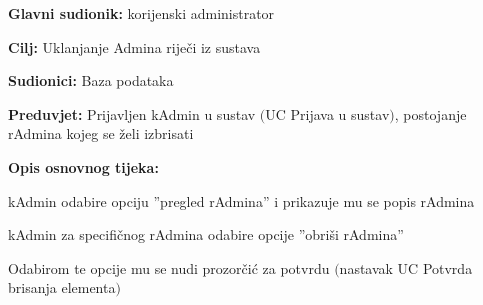 					\noindent {}
					\begin{packed_item}
	
						\item \textbf{Glavni sudionik: }korijenski administrator
						\item  \textbf{Cilj:} Uklanjanje Admina riječi iz sustava
						\item  \textbf{Sudionici:} Baza podataka
						\item  \textbf{Preduvjet:} Prijavljen kAdmin u sustav $($UC Prijava u sustav$)$, postojanje
						rAdmina kojeg se želi izbrisati
						\item  \textbf{Opis osnovnog tijeka:}
						
						\item[] \begin{packed_enum}
	
							\item kAdmin odabire opciju ”pregled rAdmina” i prikazuje mu se popis rAdmina
							\item kAdmin za specifičnog rAdmina odabire opcije ”obriši rAdmina”
							\item Odabirom te opcije mu se nudi prozorčić za potvrdu $($nastavak UC Potvrda brisanja elementa$)$
						\end{packed_enum}
						
					\end{packed_item}

